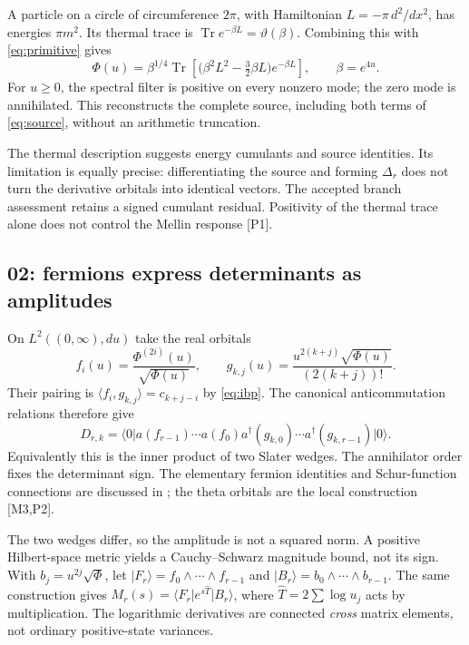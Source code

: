 \documentclass[11pt,letterpaper]{article}
\numberwithin{equation}{section}
\theoremstyle{remark}
\DeclareMathOperator{\Tr}{Tr}
\newcommand{\evid}[1]{\textsf{[#1]}}
\newcommand{\ket}[1]{\lvert #1\rangle}
\newcommand{\bra}[1]{\langle #1\rvert}
\newcommand{\ip}[2]{\langle #1,#2\rangle}
\begin{document}
A particle on a circle of circumference $2\pi$, with Hamiltonian
$L=-\pi\,d^2/dx^2$, has energies $\pi m^2$. Its thermal trace is
$\Tr e^{-\beta L}=\vartheta(\beta)$. Combining this with
\eqref{eq:primitive} gives
\begin{equation}
 \Phi(u)=\beta^{1/4}\Tr\left[
   \bigl(\beta^2L^2-\tfrac32\beta L\bigr)e^{-\beta L}\right],
 \qquad \beta=e^{4u}. \label{eq:thermal}
\end{equation}
For $u\ge0$, the spectral filter is positive on every nonzero mode;
the zero mode is annihilated. This reconstructs the complete source,
including both terms of \eqref{eq:source}, without an arithmetic
truncation.

The thermal description suggests energy cumulants and source identities.
Its limitation is equally precise: differentiating the source and
forming $\Delta_r$ does not turn the derivative orbitals into identical
vectors. The accepted branch assessment retains a signed cumulant
residual. Positivity of the thermal trace alone does not control the
Mellin response \evid{P1}.

\subsection{02: fermions express determinants as amplitudes}

On $L^2((0,\infty),du)$ take the real orbitals
\begin{equation}
 f_i(u)=\frac{\Phi^{(2i)}(u)}{\sqrt{\Phi(u)}},\qquad
 g_{k,j}(u)=\frac{u^{2(k+j)}\sqrt{\Phi(u)}}{(2(k+j))!}.
\end{equation}
Their pairing is $\ip{f_i}{g_{k,j}}=c_{k+j-i}$ by \eqref{eq:ibp}.
The canonical anticommutation relations therefore give
\begin{equation}
 D_{r,k}=\bra{0}a(f_{r-1})\cdots a(f_0)
                  a^\dagger(g_{k,0})\cdots a^\dagger(g_{k,r-1})\ket{0}.
 \label{eq:fermion}
\end{equation}
Equivalently this is the inner product of two Slater wedges.
The annihilator order fixes the determinant sign. The elementary
fermion identities and Schur-function connections are discussed in
\cite{AlexandrovZabrodin2013}; the theta orbitals are the local
construction \evid{M3,P2}.

The two wedges differ, so the amplitude is not a squared norm. A
positive Hilbert-space metric yields a Cauchy--Schwarz magnitude bound,
not its sign. With $b_j=u^{2j}\sqrt\Phi$, let $\ket{F_r}=f_0\wedge\cdots\wedge f_{r-1}$
and $\ket{B_r}=b_0\wedge\cdots\wedge b_{r-1}$. The same construction gives
$M_r(s)=\bra{F_r}e^{s\widehat T}\ket{B_r}$, where
$\widehat T=2\sum\log u_j$ acts by multiplication. The logarithmic
derivatives are connected \emph{cross} matrix elements, not ordinary
positive-state variances.
\end{document}
